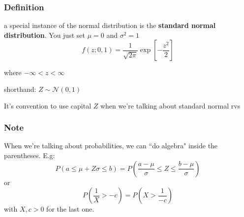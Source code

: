 \documentclass{beamer}
\begin{document}


% 
% 
% 
% 
% 
% 



\begin{frame}
\frametitle{Definition}

a special instance of the normal distribution is the \textbf{standard normal distribution}. You just set $\mu = 0$ and $\sigma^2 = 1$
\[
f(z;0,1) = \frac{1}{\sqrt{2 \pi }} \exp\left[-\frac{z^2}{2} \right] 
\]

where $-\infty < z < \infty$
\newline

shorthand: $Z \sim \mathcal{N}(0, 1)$
\newline

It's convention to use capital $Z$ when we're talking about standard normal rvs
\end{frame}



\begin{frame}
\frametitle{Note}

When we're talking about probabilities, we can ``do algebra" inside the parentheses. E.g:
\[
P(a \le \mu + Z \sigma \le b) = P \left( \frac{a - \mu}{\sigma} \le Z \le \frac{b - \mu}{\sigma}\right)
\]
or
\[
P \left( \frac{1}{X} > - c \right) = P \left( X > \frac{1}{-c} \right)
\]
with $X,c > 0$ for the last one.
\end{frame}
\end{document}
